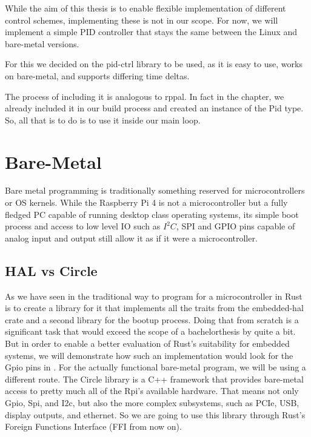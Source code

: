 While the aim of this thesis is to enable flexible implementation of different control schemes, implementing these is not in our scope.
For now, we will implement a simple PID controller that stays the same between the Linux and bare-metal versions.

For this we decided on the pid-ctrl library to be used, as it is easy to use, works on bare-metal, and supports differing time deltas.

The process of including it is analogous to rppal.
In fact in the  chapter,
we already included it in our build process and created an instance of the Pid type.
So, all that is to do is to use it inside our main loop.



\section{Bare-Metal}
\label{sec:concept_and_implementation:bare_metal}

Bare metal programming is traditionally something reserved for microcontrollers or OS kernels.
While the Raspberry Pi 4 is not a microcontroller but a fully fledged PC capable of running desktop class operating systems,
its simple boot process and access to low level IO such as $I^2C$, SPI and GPIO pins capable of analog input and output still allow it as if it were a microcontroller.

\subsection{HAL vs Circle}
\label{sec:concept_and_implementation:bare-metal:hal}

As we have seen in  the traditional way to program for a microcontroller in Rust
is to create a library for it that implements all the traits from the embedded-hal crate and a second library for the bootup process.
Doing that from scratch is a significant task that would exceed the scope of a bachelorthesis by quite a bit.
But in order to enable a better evaluation of Rust's suitability for embedded systems, we will demonstrate how such an implementation would look for the Gpio pins in .
For the actually functional bare-metal program, we will be using a different route.
The Circle library is a C++ framework that provides bare-metal access to pretty much all of the Rpi's available hardware.
That means not only Gpio, Spi, and I2c, but also the more complex subsystems, such as PCIe, USB, display outputs, and ethernet.
So we are going to use this library through Rust's Foreign Functions Interface (FFI from now on).

